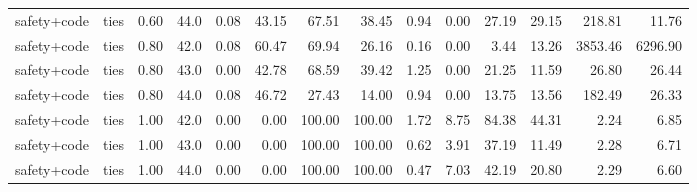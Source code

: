 \documentclass{article}
\begin{document}
\begin{table}[H]
{\begin{tabular}{llllrrrrrrrrrr}
safety+code & ties & 0.60 & 44.0 & 0.08 & 43.15 & 67.51 & 38.45 & 0.94 & 0.00 & 27.19 & 29.15 & 218.81 & 11.76 \\
safety+code & ties & 0.80 & 42.0 & 0.08 & 60.47 & 69.94 & 26.16 & 0.16 & 0.00 & 3.44 & 13.26 & 3853.46 & 6296.90 \\
safety+code & ties & 0.80 & 43.0 & 0.00 & 42.78 & 68.59 & 39.42 & 1.25 & 0.00 & 21.25 & 11.59 & 26.80 & 26.44 \\
safety+code & ties & 0.80 & 44.0 & 0.08 & 46.72 & 27.43 & 14.00 & 0.94 & 0.00 & 13.75 & 13.56 & 182.49 & 26.33 \\
safety+code & ties & 1.00 & 42.0 & 0.00 & 0.00 & 100.00 & 100.00 & 1.72 & 8.75 & 84.38 & 44.31 & 2.24 & 6.85 \\
safety+code & ties & 1.00 & 43.0 & 0.00 & 0.00 & 100.00 & 100.00 & 0.62 & 3.91 & 37.19 & 11.49 & 2.28 & 6.71 \\
safety+code & ties & 1.00 & 44.0 & 0.00 & 0.00 & 100.00 & 100.00 & 0.47 & 7.03 & 42.19 & 20.80 & 2.29 & 6.60 \\
\bottomrule
\end{tabular}
}
\end{table}
\end{document}
